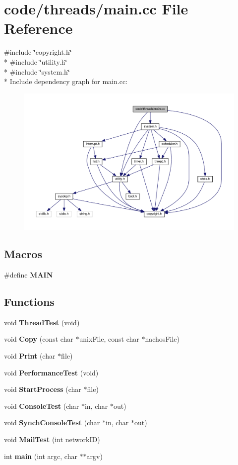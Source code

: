 \section{code/threads/main.cc File Reference}
\label{main_8cc}
{\ttfamily \#include \char`\"{}copyright.\+h\char`\"{}}\\*
{\ttfamily \#include \char`\"{}utility.\+h\char`\"{}}\\*
{\ttfamily \#include \char`\"{}system.\+h\char`\"{}}\\*
Include dependency graph for main.\+cc\+:
\nopagebreak
\begin{figure}[H]
\begin{center}
\leavevmode
\includegraphics[width=350pt]{main_8cc__incl}
\end{center}
\end{figure}
\subsection*{Macros}
\begin{DoxyCompactItemize}
\item 
\#define {\bf M\+A\+IN}
\end{DoxyCompactItemize}
\subsection*{Functions}
\begin{DoxyCompactItemize}
\item 
void {\bf Thread\+Test} (void)
\item 
void {\bf Copy} (const char $\ast$unix\+File, const char $\ast$nachos\+File)
\item 
void {\bf Print} (char $\ast$file)
\item 
void {\bf Performance\+Test} (void)
\item 
void {\bf Start\+Process} (char $\ast$file)
\item 
void {\bf Console\+Test} (char $\ast$in, char $\ast$out)
\item 
void {\bf Synch\+Console\+Test} (char $\ast$in, char $\ast$out)
\item 
void {\bf Mail\+Test} (int network\+ID)
\item 
int {\bf main} (int argc, char $\ast$$\ast$argv)
\end{DoxyCompactItemize}


